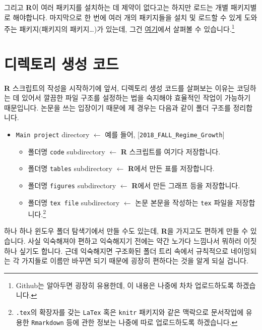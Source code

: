 \documentclass[]{book}
\providecommand{\tightlist}{%
  \setlength{\itemsep}{0pt}\setlength{\parskip}{0pt}}
\let\rmarkdownfootnote\footnote%
\def\footnote{\protect\rmarkdownfootnote}
\begin{document}
그리고 \textbf{R}이 여러 패키지를 설치하는 데 제약이 없다고는 하지만 로드는 개별 패키지별로 해야합니다. 마지막으로 한 번에 여러 개의 패키지들을 설치 및 로드할 수 있게 도와주는 패키지(패키지의 패키지\ldots{})가 있는데, 그건 \href{https://gist.github.com/stevenworthington/3178163}{여기}에서 살펴볼 수 있습니다.\footnote{Github는 알아두면 굉장히 유용한데, 이 내용은 나중에 차차 업로드하도록 하겠습니다.}

\hypertarget{uxb514uxb809uxd1a0uxb9ac-uxc0dduxc131-uxcf54uxb4dc}{%
\section{디렉토리 생성 코드}\label{uxb514uxb809uxd1a0uxb9ac-uxc0dduxc131-uxcf54uxb4dc}}

\textbf{R} 스크립트의 작성을 시작하기에 앞서, 디렉토리 생성 코드를 살펴보는 이유는 코딩하는 데 있어서 깔끔한 파일 구조를 설정하는 법을 숙지해야 효율적인 작업이 가능하기 때문입니다. 논문을 쓰는 입장이기 때문에 제 경우는 다음과 같이 폴더 구조를 정리합니다.

\begin{itemize}
\tightlist
\item
  \texttt{Main\ project} directory \(\leftarrow\) 예를 들어, {[}\texttt{2018\_FALL\_Regime\_Growth}{]}

  \begin{itemize}
  \tightlist
  \item
    폴더명 \texttt{code} subdirectory \(\leftarrow\) \textbf{R} 스크립트를 여기다 저장합니다.
  \item
    폴더명 \texttt{tables} subdirectory \(\leftarrow\) \textbf{R}에서 만든 표를 저장합니다.
  \item
    폴더명 \texttt{figures} subdirectory \(\leftarrow\) \textbf{R}에서 만든 그래프 등을 저장합니다.
  \item
    폴더명 \texttt{tex\ file} subdirectory \(\leftarrow\) 논문 본문을 작성하는 \texttt{tex} 파일을 저장합니다.\footnote{\texttt{.tex}의 확장자를 갖는 \texttt{LaTex} 혹은 \texttt{knitr} 패키지와 같은 맥락으로 문서작업에 유용한 \texttt{Rmarkdown} 등에 관한 정보는 나중에 따로 업로드하도록 하겠습니다.}
  \end{itemize}
\end{itemize}

하나 하나 윈도우 폴더 탐색기에서 만들 수도 있는데, \textbf{R}을 가지고도 편하게 만들 수 있습니다. 사실 익숙해져야 편하고 익숙해지기 전에는 약간 노가다 느낌나서 뭐하러 이짓하나 싶기도 합니다. 근데 익숙해지면 구조화된 폴더 트리 속에서 규칙적으로 네이밍되는 각 가지들로 이름만 바꾸면 되기 때문에 굉장히 편하다는 것을 알게 되실 겁니다.
\end{document}
